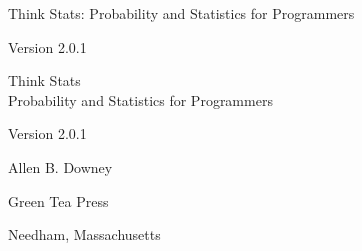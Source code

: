 \documentclass[12pt]{book}
\newcommand{\theversion}{2.0.1}
\begin{document}
\begin{latexonly}

\renewcommand{\blankpage}{\thispagestyle{empty} \quad \newpage}



\thispagestyle{empty}

\begin{flushright}
\vspace*{2.0in}

\begin{spacing}{3}
{\huge Think Stats: Probability and Statistics for Programmers}\\
{\Large }
\end{spacing}

\vspace{0.25in}

Version \theversion

\vfill

\end{flushright}


\blankpage
\blankpage

\pagebreak
\thispagestyle{empty}

\begin{flushright}
\vspace*{2.0in}

\begin{spacing}{3}
{\huge Think Stats}\\
{\Large Probability and Statistics for Programmers}
\end{spacing}

\vspace{0.25in}

Version \theversion

\vspace{1in}


{\Large
Allen B. Downey\\
}


\vspace{0.5in}

{\Large Green Tea Press}

{\small Needham, Massachusetts}


\end{flushright}
\end{latexonly}
\end{document}
